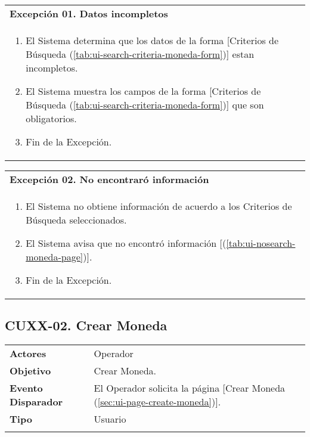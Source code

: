 \begin{tabular}{ p{15.5cm} }
	\textbf{Excepción 01. Datos incompletos} \\
	\begin{enumerate}
		\item El Sistema determina que los datos de la forma [Criterios de Búsqueda (\ref{tab:ui-search-criteria-moneda-form})] estan incompletos.
		\item El Sistema muestra los campos de la forma [Criterios de Búsqueda (\ref{tab:ui-search-criteria-moneda-form})] que son obligatorios.
		\item Fin de la Excepción.
	\end{enumerate}
\end{tabular}

\begin{tabular}{ p{15.5cm} }
	\textbf{Excepción 02. No encontraró información} \\
	\begin{enumerate}
		\item El Sistema no obtiene información de acuerdo a los Criterios de Búsqueda seleccionados.
		\item El Sistema avisa que no encontró información [(\ref{tab:ui-nosearch-moneda-page})].
		\item Fin de la Excepción.
	\end{enumerate}
\end{tabular}


\clearpage
\subsection{CUXX-02. Crear Moneda} \label{sec:cu-create-Moneda}

\begin{tabular}{ p{3.5cm} p{11.5cm} }
	\textbf{Actores} & Operador\\
	\textbf{Objetivo} & Crear Moneda.\\
	\textbf{Evento Disparador} & El Operador solicita la página [Crear Moneda (\ref{sec:ui-page-create-moneda})].\\
	\textbf{Tipo} & Usuario\\
	\\
\end{tabular}

